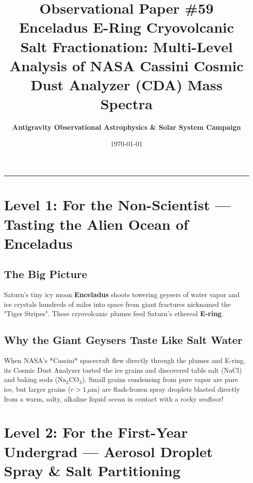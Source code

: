 \documentclass[11pt,a4paper]{article}
\title{\Huge \textbf{Observational Paper \#59}\\ \Large Enceladus E-Ring Cryovolcanic Salt Fractionation: Multi-Level Analysis of NASA Cassini Cosmic Dust Analyzer (CDA) Mass Spectra}
\author{\textbf{Antigravity Observational Astrophysics \& Solar System Campaign}}
\date{\today}
\begin{document}
\maketitle

\vspace{-1em}
\begin{center}
\rule{\textwidth}{1.5pt}
\end{center}

\section*{Level 1: For the Non-Scientist — Tasting the Alien Ocean of Enceladus}

\subsection*{The Big Picture}
Saturn's tiny icy moon \textbf{Enceladus} shoots towering geysers of water vapor and ice crystals hundreds of miles into space from giant fractures nicknamed the "Tiger Stripes". These cryovolcanic plumes feed Saturn's ethereal \textbf{E-ring}.

\subsection*{Why the Giant Geysers Taste Like Salt Water}
When NASA's *Cassini* spacecraft flew directly through the plumes and E-ring, its Cosmic Dust Analyzer tasted the ice grains and discovered table salt ($\mathrm{NaCl}$) and baking soda ($\mathrm{Na_2CO_3}$). Small grains condensing from pure vapor are pure ice, but larger grains ($r > 1\,\mu\mathrm{m}$) are flash-frozen spray droplets blasted directly from a warm, salty, alkaline liquid ocean in contact with a rocky seafloor!

\newpage

\section*{Level 2: For the First-Year Undergrad — Aerosol Droplet Spray \& Salt Partitioning}
\end{document}
